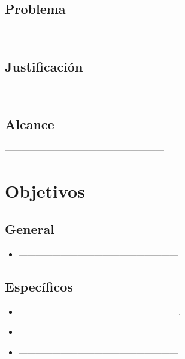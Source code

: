 \documentclass[preprint,12pt]{elsarticle}
\begin{document}
	\subsection{\textbf{Problema}}
---------------------------------------------------------
	\subsection{\textbf{Justificación }}
---------------------------------------------------------

	\subsection{\textbf{ Alcance }}
---------------------------------------------------------


\section{Objetivos}
		\subsection{\textbf{ General }}
	 \begin{itemize}
		\item ---------------------------------------------------------
	 \end{itemize}
		\subsection{\textbf{Específicos }}
\begin{itemize}
	\item ---------------------------------------------------------.
	\item --------------------------------------------------------- 
	\item --------------------------------------------------------- 
	\end{itemize}
\end{document}
